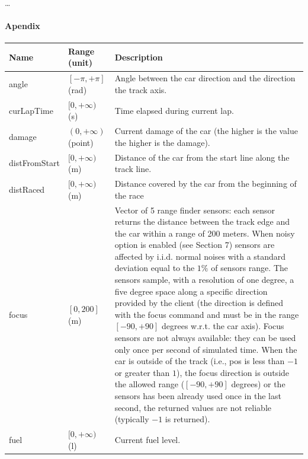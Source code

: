 \documentclass[declaration,shortabstract,english,inz]{iithesis}
\begin{document}

\begin{thebibliography}{1}
 \ldots
\end{thebibliography}

\newpage
\paragraph{Apendix}


\begin{center}
    \begin{longtable}{ | p{} |p{}| p{} |}
     \hline
     \textbf{Name} & \textbf{Range (unit)} & \textbf{Description} \\ 
     \hline
     angle & $[-\pi, +\pi]$ (rad) & Angle between the car direction and the direction the track axis. \\  
     \hline
     curLapTime & $[0, +\infty)$ (s) & Time elapsed during current lap. \\
     \hline
     damage & $(0, +\infty)$ (point) & Current damage of the car (the higher is the value the higher is the damage). \\
     \hline
     distFromStart & $[0, +\infty)$ (m) & Distance of the car from the start line along the track line. \\
     \hline
     distRaced & $[0, +\infty)$ (m) & Distance covered by the car from the beginning of the race \\
     \hline
     focus & $[0, 200]$ (m) & Vector of 5 range finder sensors: each sensor returns the distance between the track edge and the car within a range of 200 meters. When noisy option is enabled (see Section 7) sensors are affected by i.i.d. normal noises with a standard deviation equal to the $1\%$ of sensors range. The sensors sample, with a resolution of one degree, a five degree space along a specific direction provided by the client (the direction is defined with the focus command and must be in the range $[-90,+90]$ degrees w.r.t. the car axis). Focus sensors are not always available: they can be used only once per second of simulated time. When the car is outside of the track (i.e., pos is less than $-1$ or greater than $1$), the focus direction is outside the allowed range ($[-90,+90]$ degrees) or the sensors has been already used once in the last second, the returned values are not reliable (typically $-1$ is returned). \\
     \hline
     fuel & $[0, +\infty)$ (l) & Current fuel level. \\

\end{longtable}
\end{center}
\end{document}
